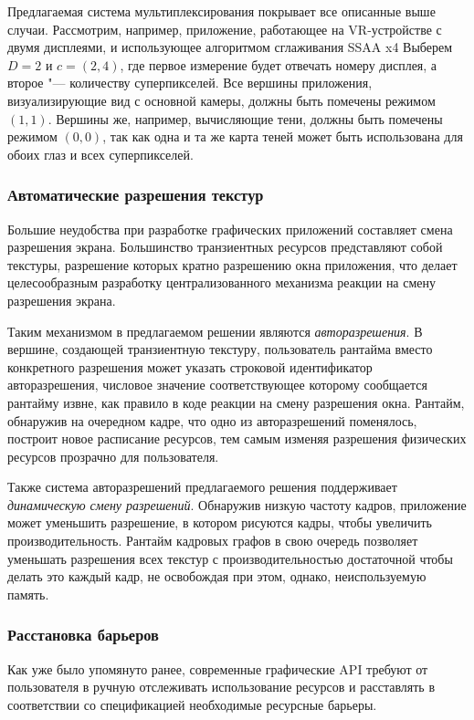 Предлагаемая система мультиплексирования покрывает все описанные выше случаи.
Рассмотрим, например, приложение, работающее на VR-устройстве с двумя дисплеями, и использующее алгоритмом сглаживания SSAA x4
Выберем $D = 2$ и $c = (2, 4)$, где первое измерение будет отвечать номеру дисплея, а второе "--- количеству суперпикселей.
Все вершины приложения, визуализирующие вид с основной камеры, должны быть помечены режимом $(1, 1)$.
Вершины же, например, вычисляющие тени, должны быть помечены режимом $(0, 0)$, так как одна и та же карта теней может быть использована для обоих глаз и всех суперпикселей.

\subsubsection{Автоматические разрешения текстур}
Большие неудобства при разработке графических приложений составляет смена разрешения экрана.
Большинство транзиентных ресурсов представляют собой текстуры, разрешение которых кратно разрешению окна приложения, что делает целесообразным разработку централизованного механизма реакции на смену разрешения экрана.

Таким механизмом в предлагаемом решении являются \textit{авторазрешения}.
В вершине, создающей транзиентную текстуру, пользователь рантайма вместо конкретного разрешения может указать строковой идентификатор авторазрешения, числовое значение соответствующее которому сообщается рантайму извне, как правило в коде реакции на смену разрешения окна.
Рантайм, обнаружив на очередном кадре, что одно из авторазрешений поменялось, построит новое расписание ресурсов, тем самым изменяя разрешения физических ресурсов прозрачно для пользователя.

Также система авторазрешений предлагаемого решения поддерживает \textit{динамическую смену разрешений}.
Обнаружив низкую частоту кадров, приложение может уменьшить разрешение, в котором рисуются кадры, чтобы увеличить производительность.
Рантайм кадровых графов в свою очередь позволяет уменьшать разрешения всех текстур с производительностью достаточной чтобы делать это каждый кадр, не освобождая при этом, однако, неиспользуемую память.

\subsubsection{Расстановка барьеров}
Как уже было упомянуто ранее, современные графические API требуют от пользователя в ручную отслеживать использование ресурсов и расставлять в соответствии со спецификацией необходимые ресурсные барьеры.

